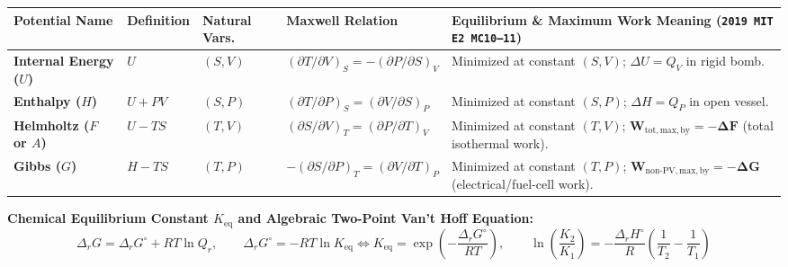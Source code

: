 \begin{formulacard}
\par\smallskip\noindent
\footnotesize\setlength{\tabcolsep}{3.5pt}\renewcommand{\arraystretch}{1.14}
\begin{tabularx}{\linewidth}{@{}l l l l X@{}}
\toprule
\textbf{Potential Name} & \textbf{Definition} & \textbf{Natural Vars.} & \textbf{Maxwell Relation} & \textbf{Equilibrium \& Maximum Work Meaning (\texttt{2019 MIT E2 MC10--11})} \\
\midrule
\textbf{Internal Energy ($U$)} & $U$ & $(S, V)$ & $(\partial T/\partial V)_S = -(\partial P/\partial S)_V$ & Minimized at constant $(S, V)$; $\Delta U = Q_V$ in rigid bomb. \\
\textbf{Enthalpy ($H$)} & $U + PV$ & $(S, P)$ & $(\partial T/\partial P)_S = (\partial V/\partial S)_P$ & Minimized at constant $(S, P)$; $\Delta H = Q_P$ in open vessel. \\
\textbf{Helmholtz ($F$ or $A$)} & $U - TS$ & $(T, V)$ & $(\partial S/\partial V)_T = (\partial P/\partial T)_V$ & Minimized at constant $(T, V)$; $\mathbf{W_{\mathrm{tot,max,by}} = -\Delta F}$ (total isothermal work). \\
\textbf{Gibbs ($G$)} & $H - TS$ & $(T, P)$ & $-(\partial S/\partial P)_T = (\partial V/\partial T)_P$ & Minimized at constant $(T, P)$; $\mathbf{W_{\mathrm{non\text{-}PV,max,by}} = -\Delta G}$ (electrical/fuel-cell work). \\
\bottomrule
\end{tabularx}
\par\smallskip\noindent
{}
\textbf{Chemical Equilibrium Constant $K_{\mathrm{eq}}$ and Algebraic Two-Point Van't Hoff Equation:}
\begin{equation}\label{eq:08:vant-hoff}
  \Delta_r G = \Delta_r G^\circ + RT\ln Q_r, \qquad \boxed{\Delta_r G^\circ = -RT\ln K_{\mathrm{eq}} \iff K_{\mathrm{eq}} = \exp\left(-\frac{\Delta_r G^\circ}{RT}\right)}, \qquad \boxed{\ln\left(\frac{K_2}{K_1}\right) = -\frac{\Delta_r H^\circ}{R}\left(\frac{1}{T_2} - \frac{1}{T_1}\right)}
\end{equation}
\end{formulacard}

